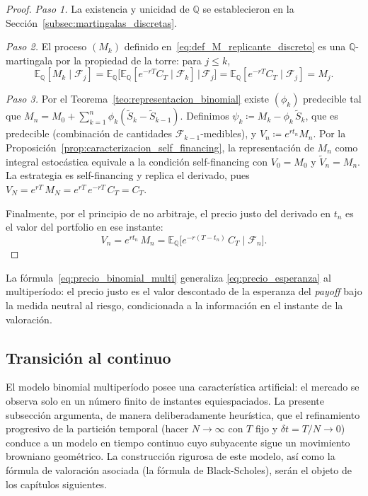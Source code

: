 \documentclass[11pt,a4paper,oneside]{report}
\theoremstyle{plain}
\theoremstyle{definition}
\theoremstyle{remark}
\newcommand{\E}{\mathbb{E}}
\newcommand{\Q}{\mathbb{Q}}
\newcommand{\F}{\mathcal{F}}
\newcommand{\1}{\mathbf{1}}
\newcommand{\eqdef}{\coloneqq}
\begin{document}
\begin{proof}
\emph{Paso 1.} La existencia y unicidad de $\Q$ se establecieron en la
Sección~\ref{subsec:martingalas_discretas}.

\emph{Paso 2.} El proceso $(M_k)$ definido
en~\eqref{eq:def_M_replicante_discreto} es una $\Q$-martingala por la
propiedad de la torre: para $j \leq k$,
\begin{equation*}
  \E_\Q[M_k \mid \F_j]
  = \E_\Q\bigl[\E_\Q[e^{-rT} C_T \mid \F_k] \,\big|\, \F_j\bigr]
  = \E_\Q[e^{-rT} C_T \mid \F_j] = M_j.
\end{equation*}

\emph{Paso 3.} Por el Teorema~\ref{teo:representacion_binomial} existe
$(\phi_k)$ predecible tal que $M_n = M_0 + \sum_{k=1}^n \phi_k(\widetilde
S_k - \widetilde S_{k-1})$. Definimos $\psi_k \eqdef M_k - \phi_k\,
\widetilde S_k$, que es predecible (combinación de cantidades
$\F_{k-1}$-medibles), y $V_n \eqdef e^{r t_n} M_n$. Por la
Proposición~\ref{prop:caracterizacion_self_financing}, la representación
de $M_n$ como integral estocástica equivale a la condición
self-financing con $V_0 = M_0$ y $\widetilde V_n = M_n$. La estrategia
es self-financing y replica el derivado, pues $V_N = e^{rT}\, M_N =
e^{rT}\, e^{-rT}\, C_T = C_T$.

Finalmente, por el principio de no arbitraje, el precio justo del
derivado en $t_n$ es el valor del portfolio en ese instante:
\begin{equation*}
  V_n = e^{r t_n}\, M_n = \E_\Q\bigl[e^{-r(T - t_n)}\, C_T \mid \F_n\bigr].
\end{equation*}
\end{proof}

La fórmula~\eqref{eq:precio_binomial_multi} generaliza
\eqref{eq:precio_esperanza} al multiperíodo: el precio justo es el
valor descontado de la esperanza del \emph{payoff} bajo la medida
neutral al riesgo, condicionada a la información en el instante de
la valoración.

\subsection{Transición al continuo}
\label{subsec:obertura_continuo}

El modelo binomial
multiperíodo posee una característica artificial: el mercado se
observa solo en un número finito de instantes equiespaciados. La
presente subsección argumenta, de manera deliberadamente heurística,
que el refinamiento progresivo de la partición temporal (hacer $N \to
\infty$ con $T$ fijo y $\delta t = T/N \to 0$) conduce a un modelo en
tiempo continuo cuyo subyacente sigue un movimiento browniano
geométrico. La construcción rigurosa de este modelo, así como la
fórmula de valoración asociada (la fórmula de Black-Scholes), serán el
objeto de los capítulos siguientes.
\end{document}
